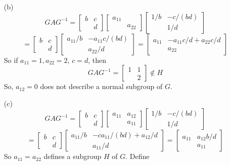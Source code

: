 \begin{itemize}
\begin{itemize}
\item[(b)]
$$GAG^{-1} = \begin{bmatrix}
b & c \\
& d
\end{bmatrix}\begin{bmatrix}
a_{11} & \\
& a_{22}
\end{bmatrix}\begin{bmatrix}
1/b & -c/(bd) \\
& 1/d
\end{bmatrix}$$
$$= \begin{bmatrix}
b & c \\
& d
\end{bmatrix}\begin{bmatrix}
a_{11}/b & -a_{11}c/(bd) \\
& a_{22}/d
\end{bmatrix} = \begin{bmatrix}
a_{11} & -a_{11}c/d + a_{22}c/d \\
& a_{22}
\end{bmatrix}$$
So if $a_{11} = 1, a_{22} = 2$, $c = d$, then
$$GAG^{-1} = \begin{bmatrix}
1 & 1 \\
& 2
\end{bmatrix} \not \in H$$
So, $a_{12} = 0$ does not describe a normal subgroup of $G$.
\item[(c)]
$$GAG^{-1} = \begin{bmatrix}
b & c \\
& d
\end{bmatrix}\begin{bmatrix}
a_{11} & a_{12} \\
& a_{11}
\end{bmatrix}\begin{bmatrix}
1/b & -c/(bd) \\
& 1/d
\end{bmatrix}$$
$$= \begin{bmatrix}
b & c \\
& d
\end{bmatrix}\begin{bmatrix}
a_{11}/b & -ca_{11}/(bd) + a_{12}/d \\
& a_{11}/d
\end{bmatrix} = \begin{bmatrix}
a_{11} & a_{12}b/d \\
& a_{11}
\end{bmatrix}$$
So $a_{11} = a_{22}$ defines a subgroup $H$ of $G$. Define

\end{itemize}
\end{itemize}
